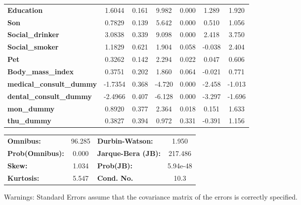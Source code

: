 \documentclass{report}
\begin{document}
\begin{center}
\begin{tabular}{lcccccc}
\textbf{Education}                           &       1.6044  &        0.161     &     9.982  &         0.000        &        1.289    &        1.920     \\
\textbf{Son}                                 &       0.7829  &        0.139     &     5.642  &         0.000        &        0.510    &        1.056     \\
\textbf{Social\_drinker}                     &       3.0838  &        0.339     &     9.098  &         0.000        &        2.418    &        3.750     \\
\textbf{Social\_smoker}                      &       1.1829  &        0.621     &     1.904  &         0.058        &       -0.038    &        2.404     \\
\textbf{Pet}                                 &       0.3262  &        0.142     &     2.294  &         0.022        &        0.047    &        0.606     \\
\textbf{Body\_mass\_index}                   &       0.3751  &        0.202     &     1.860  &         0.064        &       -0.021    &        0.771     \\
\textbf{medical\_consult\_dummy}             &      -1.7354  &        0.368     &    -4.720  &         0.000        &       -2.458    &       -1.013     \\
\textbf{dental\_consult\_dummy}              &      -2.4966  &        0.407     &    -6.128  &         0.000        &       -3.297    &       -1.696     \\
\textbf{mon\_dummy}                          &       0.8920  &        0.377     &     2.364  &         0.018        &        0.151    &        1.633     \\
\textbf{thu\_dummy}                          &       0.3827  &        0.394     &     0.972  &         0.331        &       -0.391    &        1.156     \\
\bottomrule
\end{tabular}
\begin{tabular}{lclc}
\textbf{Omnibus:}       & 96.285 & \textbf{  Durbin-Watson:     } &    1.950  \\
\textbf{Prob(Omnibus):} &  0.000 & \textbf{  Jarque-Bera (JB):  } &  217.486  \\
\textbf{Skew:}          &  1.034 & \textbf{  Prob(JB):          } & 5.94e-48  \\
\textbf{Kurtosis:}      &  5.547 & \textbf{  Cond. No.          } &     10.3  \\
\bottomrule
\end{tabular}
\end{center}

Warnings: \newline
 [1] Standard Errors assume that the covariance matrix of the errors is correctly specified.
\end{document}
